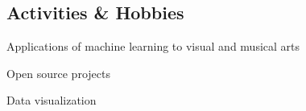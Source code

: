 \documentclass[margin]{res}
\begin{document}
\begin{resume}
        \section{Activities \& Hobbies}
        \begin{description}
        	\item Applications of machine learning to visual and musical arts
            \item Open source projects
            \item Data visualization
        \end{description}
    \end{resume}
\end{document}
